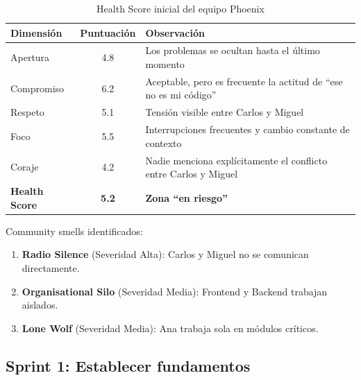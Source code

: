 \begin{table}[h]
    \centering
    \small
    \begin{tabularx}{\textwidth}{|l|c|X|}
        \hline
        \textbf{Dimensión} & \textbf{Puntuación}                                              & \textbf{Observación} \\
        \hline
        Apertura
                           & 4.8
                           & Los problemas se ocultan hasta el último momento                                        \\
        \hline
        Compromiso
                           & 6.2
                           & Aceptable, pero es frecuente la actitud de “ese no es mi código”                        \\
        \hline
        Respeto
                           & 5.1
                           & Tensión visible entre Carlos y Miguel                                                   \\
        \hline
        Foco
                           & 5.5
                           & Interrupciones frecuentes y cambio constante de contexto                                \\
        \hline
        Coraje
                           & 4.2
                           & Nadie menciona explícitamente el conflicto entre Carlos y Miguel                        \\
        \hline
        \textbf{Health Score}
                           & \textbf{5.2}
                           & \textbf{Zona “en riesgo”}                                                               \\
        \hline
    \end{tabularx}
    \caption{Health Score inicial del equipo Phoenix}
    \label{tab:health-score-inicial}
\end{table}
\FloatBarrier

Community smells identificados:
\begin{enumerate}
    \item \textbf{Radio Silence} (Severidad Alta): Carlos y Miguel no se comunican directamente.
    \item \textbf{Organisational Silo} (Severidad Media): Frontend y Backend trabajan aislados.
    \item \textbf{Lone Wolf} (Severidad Media): Ana trabaja sola en módulos críticos.
\end{enumerate}

\subsection{Sprint 1: Establecer fundamentos}

